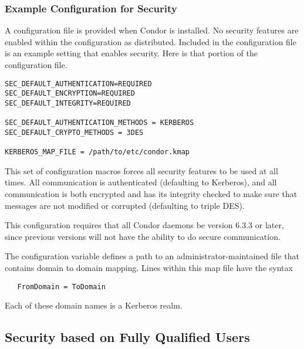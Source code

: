 \subsubsection{\label{sec:Security-sample} Example Configuration for Security}

A configuration file is provided when Condor is installed.
No security features are enabled within the configuration as
distributed.
Included in the configuration file is an example setting
that enables security.
Here is that portion of the configuration file.

\begin{verbatim}
SEC_DEFAULT_AUTHENTICATION=REQUIRED
SEC_DEFAULT_ENCRYPTION=REQUIRED
SEC_DEFAULT_INTEGRITY=REQUIRED

SEC_DEFAULT_AUTHENTICATION_METHODS = KERBEROS
SEC_DEFAULT_CRYPTO_METHODS = 3DES

KERBEROS_MAP_FILE = /path/to/etc/condor.kmap

\end{verbatim}

This set of configuration macros forces all security features
to be used at all times.
All communication is authenticated (defaulting to Kerberos),
and all communication is both encrypted and has its
integrity checked to make sure that messages
are not modified or corrupted (defaulting to triple DES).

This configuration requires that all Condor daemons be
version 6.3.3 or later, since previous versions will not have
the ability to do secure communication.

The configuration variable
defines a path to an administrator-maintained file that
contains domain to domain mapping.
Lines within this map file have the syntax
\begin{verbatim}
   FromDomain = ToDomain
\end{verbatim}
Each of these domain names is a Kerberos realm.


\subsection{\label{sec:Security-FQU}Security based on Fully Qualified Users}

